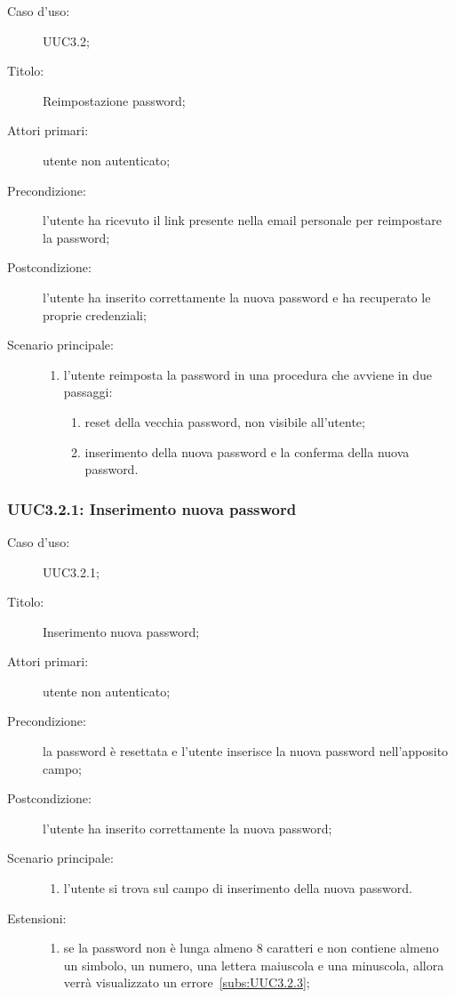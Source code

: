 \documentclass[../../../analisi-dei-requisiti.tex]{subfiles}
\begin{document}
\begin{description}
  \item[Caso d'uso:] UUC3.2;
  \item[Titolo:] Reimpostazione password;
  \item[Attori primari:] utente non autenticato;
  \item[Precondizione:] l'utente ha ricevuto il link presente nella email personale per reimpostare la password;
  \item[Postcondizione:] l'utente ha inserito correttamente la nuova password e ha recuperato le proprie credenziali;
  \item[Scenario principale:]
        \begin{enumerate}
          \item l'utente reimposta la password in una procedura che avviene in due passaggi:
                \begin{enumerate}
                  \item reset della vecchia password, non visibile all'utente;
                  \item inserimento della nuova password e la conferma della nuova password.
                \end{enumerate}
        \end{enumerate}
\end{description}

\subsubsection{UUC3.2.1: Inserimento nuova password}%
\label{subs:UUC3.2.1}
\begin{description}
  \item[Caso d'uso:] UUC3.2.1;
  \item[Titolo:] Inserimento nuova password;
  \item[Attori primari:] utente non autenticato;
  \item[Precondizione:] la password è resettata e l'utente inserisce la nuova password nell'apposito campo;
  \item[Postcondizione:] l'utente ha inserito correttamente la nuova password;
  \item[Scenario principale:]
        \begin{enumerate}
          \item l'utente si trova sul campo di inserimento della nuova password.
        \end{enumerate}
  \item[Estensioni:]
        \begin{enumerate}
          \item se la password non è lunga almeno 8 caratteri e non contiene almeno un simbolo, un numero, una lettera maiuscola e una minuscola, allora verrà visualizzato un errore~\ref{subs:UUC3.2.3};
        \end{enumerate}
\end{description}
\end{document}
